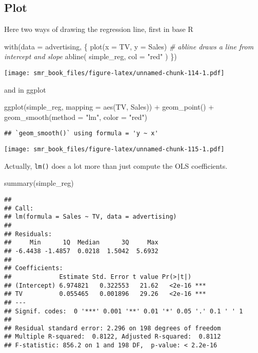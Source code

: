 \documentclass[
  oneside]{book}
\newenvironment{Shaded}{\begin{snugshade}}{\end{snugshade}}
\newcommand{\AttributeTok}[1]{\textcolor[rgb]{0.77,0.63,0.00}{#1}}
\newcommand{\CommentTok}[1]{\textcolor[rgb]{0.56,0.35,0.01}{\textit{#1}}}
\newcommand{\FunctionTok}[1]{\textcolor[rgb]{0.00,0.00,0.00}{#1}}
\newcommand{\NormalTok}[1]{#1}
\newcommand{\SpecialCharTok}[1]{\textcolor[rgb]{0.00,0.00,0.00}{#1}}
\newcommand{\StringTok}[1]{\textcolor[rgb]{0.31,0.60,0.02}{#1}}
\begin{document}
\hypertarget{plot}{%
\subsection{Plot}\label{plot}}

Here two ways of drawing the regression line,
first in base R

\begin{Shaded}
\begin{Highlighting}[]
\FunctionTok{with}\NormalTok{(}\AttributeTok{data =}\NormalTok{ advertising, \{}
  \FunctionTok{plot}\NormalTok{(}\AttributeTok{x =}\NormalTok{ TV, }\AttributeTok{y =}\NormalTok{ Sales)}
  \CommentTok{\# abline draws a line from intercept and slope}
  \FunctionTok{abline}\NormalTok{(}
\NormalTok{    simple\_reg,}
    \AttributeTok{col =} \StringTok{"red"}
\NormalTok{  )}
\NormalTok{\})}
\end{Highlighting}
\end{Shaded}

\texttt{[image: smr\_book\_files/figure-latex/unnamed-chunk-114-1.pdf]}

and in ggplot

\begin{Shaded}
\begin{Highlighting}[]
\FunctionTok{ggplot}\NormalTok{(simple\_reg, }\AttributeTok{mapping =} \FunctionTok{aes}\NormalTok{(TV, Sales)) }\SpecialCharTok{+}
  \FunctionTok{geom\_point}\NormalTok{() }\SpecialCharTok{+}
  \FunctionTok{geom\_smooth}\NormalTok{(}\AttributeTok{method =} \StringTok{"lm"}\NormalTok{, }\AttributeTok{color =} \StringTok{"red"}\NormalTok{)}
\end{Highlighting}
\end{Shaded}

\begin{verbatim}
## `geom_smooth()` using formula = 'y ~ x'
\end{verbatim}

\texttt{[image: smr\_book\_files/figure-latex/unnamed-chunk-115-1.pdf]}

Actually, \texttt{lm()} does a lot more than just compute
the OLS coefficients.

\begin{Shaded}
\begin{Highlighting}[]
\FunctionTok{summary}\NormalTok{(simple\_reg)}
\end{Highlighting}
\end{Shaded}

\begin{verbatim}
## 
## Call:
## lm(formula = Sales ~ TV, data = advertising)
## 
## Residuals:
##     Min      1Q  Median      3Q     Max 
## -6.4438 -1.4857  0.0218  1.5042  5.6932 
## 
## Coefficients:
##             Estimate Std. Error t value Pr(>|t|)    
## (Intercept) 6.974821   0.322553   21.62   <2e-16 ***
## TV          0.055465   0.001896   29.26   <2e-16 ***
## ---
## Signif. codes:  0 '***' 0.001 '**' 0.01 '*' 0.05 '.' 0.1 ' ' 1
## 
## Residual standard error: 2.296 on 198 degrees of freedom
## Multiple R-squared:  0.8122, Adjusted R-squared:  0.8112 
## F-statistic: 856.2 on 1 and 198 DF,  p-value: < 2.2e-16
\end{verbatim}
\end{document}

